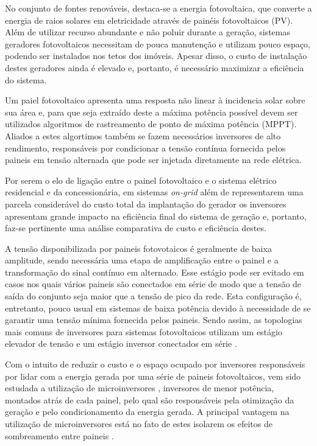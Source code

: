 \documentclass[
	12pt,				%
	openright,			%
	onseside,
	a4paper,			%
	english,			%
	french,				%
	spanish,			%
	brazil,				%
	]{abntex2}
\begin{document}
	No conjunto de fontes renováveis, destaca-se a energia fotovoltaica, que converte a energia de raios solares em eletricidade 
	através de painéis fotovoltaicos (PV). Além de utilizar recurso abundante e não poluir durante a geração, sistemas geradores 
	fotovoltaicos necessitam de pouca manutenção e utilizam pouco espaço, podendo ser instalados nos tetos dos imóveis.
	Apesar disso, o custo de instalação destes geradores ainda é elevado e, portanto, é necessário maximizar a eficiência do 
	sistema. 	

	Um paiel fotovoltaico apresenta uma resposta não linear à incidencia solar sobre sua área e, para que seja extraído deste 
	a máxima potência possível devem ser utilizados algoritmos de rastreamento de ponto de máxima potência (MPPT). Aliados a 
	estes algortimos também se fazem necessários inversores de alto rendimento, responsáveis por condicionar a tensão 
	contínua fornecida pelos paineis em tensão alternada que pode ser injetada diretamente na rede elétrica.
	
 
	Por serem o elo de ligação entre o painel fotovoltaico e o sistema elétrico residencial e da concessionária, em sistemas \textit{on-grid} além de representarem uma parcela considerável do custo total da implantação do gerador os inversores apresentam 
	grande impacto na eficiência final do sistema de geração e, portanto, faz-se pertinente uma análise comparativa de custo e eficiência destes.


	A tensão disponibilizada por paineis fotovotaicos é geralmente de baixa amplitude, sendo necessária uma etapa de amplificação 
	entre o painel e a transformação do sinal contínuo em alternado. Esse estágio pode ser evitado em casos nos quais vários paineis 
	são conectados em série de modo que a tensão de saída do conjunto seja maior que a tensão de pico da rede. Esta configuração 
	é, entretanto, pouco usual em sistemas de baixa potência devido à necessidade de se garantir uma tensão mínima fornecida pelos 
	paineis. Sendo assim, as topologias mais comuns de inversores para sistemas fotovoltaicos utilizam um estágio elevador de tensão e um estágio inversor conectados em série \cite{LUIGIJUNIOR_ev_int}.

	Com o intuito de reduzir o custo e o espaço ocupado por inversores responsáveis por lidar com a energia gerada por uma série de paineis fotovoltaicos, vem sido estudada a utilização de microinversores \cite{Bouzguenda_smart_grid_inv}, inversores de menor potência, montados atrás de cada painel, pelo qual são responsáveis pela otimização da geração e pelo condicionamento da energia gerada. A principal vantagem na utilização de microinversores está no fato de estes isolarem os efeitos de sombreamento entre paineis \cite{Nezamuddin_des_eff_micro}.
\end{document}
